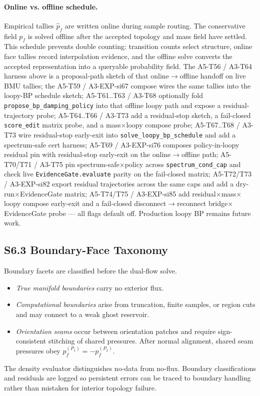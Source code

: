 \documentclass[11pt]{article}
\begin{document}
\paragraph{Online vs. offline schedule.}
Empirical tallies $\hat p_f$ are written online during sample routing. The conservative field $p_f$ is solved offline after the accepted topology and mass field have settled. This schedule prevents double counting: transition counts select structure, online face tallies record interpolation evidence, and the offline solve converts the accepted representation into a queryable probability field. The A5-T56 / A3-T64 harness above is a proposal-path sketch of that online$\to$offline handoff on live BMU tallies; the A5-T59 / A3-EXP-si67 compose wires the same tallies into the loopy-BP schedule sketch; A5-T61..T63 / A3-T68 optionally fold \texttt{propose\_bp\_damping\_policy} into that offline loopy path and expose a residual-trajectory probe; A5-T64..T66 / A3-T73 add a residual-stop sketch, a fail-closed \texttt{score\_edit} matrix probe, and a mass$\times$loopy compose probe; A5-T67..T68 / A3-T73 wire residual-stop early-exit into \texttt{solve\_loopy\_bp\_schedule} and add a spectrum-safe cert harness; A5-T69 / A3-EXP-si76 composes policy-in-loopy residual pin with residual-stop early-exit on the online$\to$offline path; A5-T70/T71 / A3-T75 pin spectrum-safe$\times$policy across \texttt{spectrum\_cond\_cap} and check live \texttt{EvidenceGate.evaluate} parity on the fail-closed matrix; A5-T72/T73 / A3-EXP-si82 export residual trajectories across the same caps and add a dry-run$\times$EvidenceGate matrix; A5-T74/T75 / A3-EXP-si85 add residual$\times$mass$\times$loopy compose early-exit and a fail-closed disconnect$\to$reconnect bridge$\times$EvidenceGate probe --- all flags default off. Production loopy BP remains future work.

\subsection*{S6.3 Boundary-Face Taxonomy}
Boundary facets are classified before the dual-flow solve.
\begin{itemize}[leftmargin=1.5em]
  \item \emph{True manifold boundaries} carry no exterior flux.
  \item \emph{Computational boundaries} arise from truncation, finite samples, or region cuts and may connect to a weak ghost reservoir.
  \item \emph{Orientation seams} occur between orientation patches and require sign-consistent stitching of shared pressures. After normal alignment, shared seam pressures obey $p_f^{(P_1)}=-p_f^{(P_2)}$.
\end{itemize}
The density evaluator distinguishes no-data from no-flux. Boundary classifications and residuals are logged so persistent errors can be traced to boundary handling rather than mistaken for interior topology failure.
\end{document}
